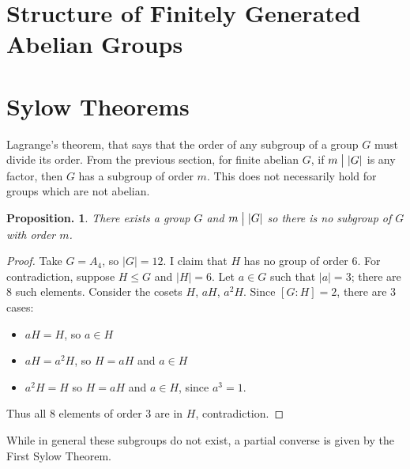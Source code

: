 \documentclass[11pt, a4paper]{memoir}
\renewcommand{\div}{\bigm|}
\theoremstyle{change}
\newtheorem{proposition}[theorem]{Proposition.}
\theoremstyle{plain}
\theoremstyle{nonumberplain}
\newtheorem{proof}{Proof}
\numberwithin{equation}{section}
\begin{document}
\section{Structure of Finitely Generated Abelian Groups}
\section{Sylow Theorems}
Lagrange's theorem, that says that the order of any subgroup of a group $G$ must divide its order.
From the previous section, for finite abelian $G$, if $m\div|G|$ is any factor, then $G$ has a subgroup of order $m$.
This does not necessarily hold for groups which are not abelian.
\begin{proposition}
    There exists a group $G$ and $m\div|G|$ so there is no subgroup of $G$ with order $m$.
\end{proposition}
\begin{proof}
    Take $G=A_4$, so $|G|=12$.
    I claim that $H$ has no group of order $6$.
    For contradiction, suppose $H\leq G$ and $|H|=6$.
    Let $a\in G$ such that $|a|=3$; there are 8 such elements.
    Consider the cosets $H$, $aH$, $a^2H$.
    Since $[G:H]=2$, there are 3 cases:
    \begin{itemize}[nolistsep]
        \item $aH=H$, so $a\in H$
        \item $aH=a^2H$, so $H=aH$ and $a\in H$
        \item $a^2H=H$ so $H=aH$ and $a\in H$, since $a^3=1$.
    \end{itemize}
    Thus all 8 elements of order 3 are in $H$, contradiction.
\end{proof}
While in general these subgroups do not exist, a partial converse is given by the First Sylow Theorem.
\end{document}
